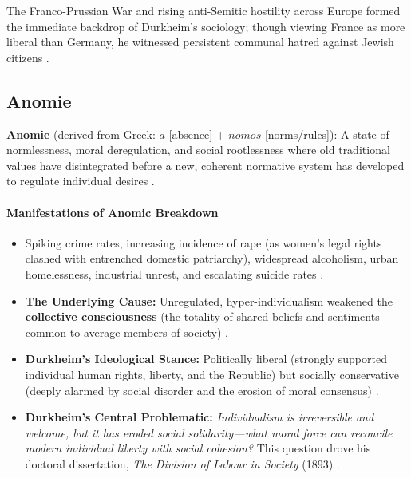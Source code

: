\begin{GovtPolicy}
The Franco-Prussian War and rising anti-Semitic hostility across Europe formed the immediate backdrop of Durkheim's sociology; though viewing France as more liberal than Germany, he witnessed persistent communal hatred against Jewish citizens .
\end{GovtPolicy}

\subsection{Anomie}

\begin{KeyConcept}
\textbf{Anomie} (derived from Greek: $a$ [absence] + $nomos$ [norms/rules]): A state of normlessness, moral deregulation, and social rootlessness where old traditional values have disintegrated before a new, coherent normative system has developed to regulate individual desires .
\end{KeyConcept}

\paragraph{Manifestations of Anomic Breakdown}
\begin{itemize}
    \item Spiking crime rates, increasing incidence of rape (as women's legal rights clashed with entrenched domestic patriarchy), widespread alcoholism, urban homelessness, industrial unrest, and escalating suicide rates .
    \item \textbf{The Underlying Cause:} Unregulated, hyper-individualism weakened the \textbf{collective consciousness} (the totality of shared beliefs and sentiments common to average members of society) .
    \item \textbf{Durkheim's Ideological Stance:} Politically liberal (strongly supported individual human rights, liberty, and the Republic) but socially conservative (deeply alarmed by social disorder and the erosion of moral consensus) .
    \item \textbf{Durkheim's Central Problematic:} \textit{Individualism is irreversible and welcome, but it has eroded social solidarity---what moral force can reconcile modern individual liberty with social cohesion?}  This question drove his doctoral dissertation, \textit{The Division of Labour in Society} (1893) .
\end{itemize}

